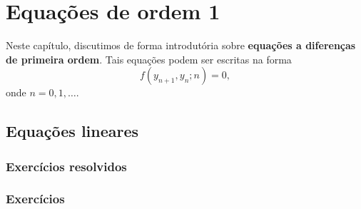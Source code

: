 
\chapter{Equações de ordem 1}\label{cap_ead1}

Neste capítulo, discutimos de forma introdutória sobre {\bf equações a diferenças de primeira ordem}. Tais equações podem ser escritas na forma
\begin{equation}
  f(y_{n+1},y_n;n)=0,
\end{equation}
onde $n=0, 1, \ldots$.

\section{Equações lineares}\label{cap_ead1_sec_eqlin}

\emconstrucao

\subsection*{Exercícios resolvidos}

\emconstrucao

\subsection*{Exercícios}

\emconstrucao